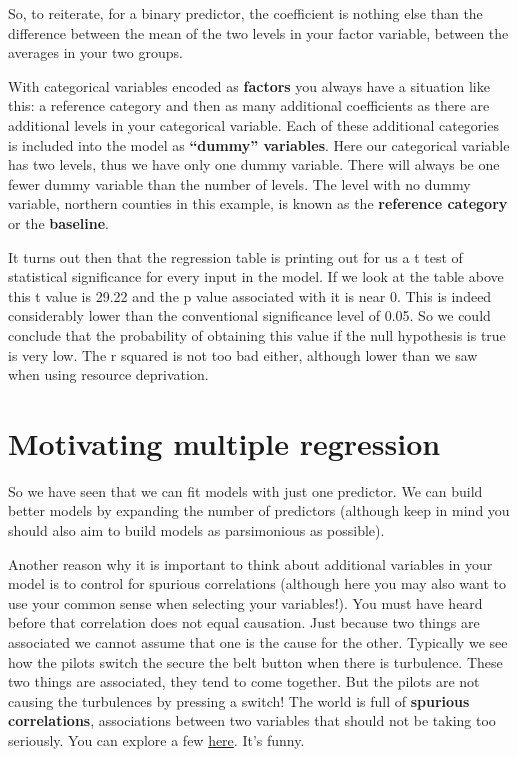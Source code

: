 \documentclass[]{book}
\begin{document}
So, to reiterate, for a binary predictor, the coefficient is nothing else than the difference between the mean of the two levels in your factor variable, between the averages in your two groups.

With categorical variables encoded as \textbf{factors} you always have a situation like this: a reference category and then as many additional coefficients as there are additional levels in your categorical variable. Each of these additional categories is included into the model as \textbf{``dummy'' variables}. Here our categorical variable has two levels, thus we have only one dummy variable. There will always be one fewer dummy variable than the number of levels. The level with no dummy variable, northern counties in this example, is known as the \textbf{reference category} or the \textbf{baseline}.

It turns out then that the regression table is printing out for us a t test of statistical significance for every input in the model. If we look at the table above this t value is 29.22 and the p value associated with it is near 0. This is indeed considerably lower than the conventional significance level of 0.05. So we could conclude that the probability of obtaining this value if the null hypothesis is true is very low. The r squared is not too bad either, although lower than we saw when using resource deprivation.

\hypertarget{motivating-multiple-regression}{%
\section{Motivating multiple regression}\label{motivating-multiple-regression}}

So we have seen that we can fit models with just one predictor. We can build better models by expanding the number of predictors (although keep in mind you should also aim to build models as parsimonious as possible).

Another reason why it is important to think about additional variables in your model is to control for spurious correlations (although here you may also want to use your common sense when selecting your variables!). You must have heard before that correlation does not equal causation. Just because two things are associated we cannot assume that one is the cause for the other. Typically we see how the pilots switch the secure the belt button when there is turbulence. These two things are associated, they tend to come together. But the pilots are not causing the turbulences by pressing a switch! The world is full of \textbf{spurious correlations}, associations between two variables that should not be taking too seriously. You can explore a few \href{http://tylervigen.com/}{here}. It's funny.
\end{document}
